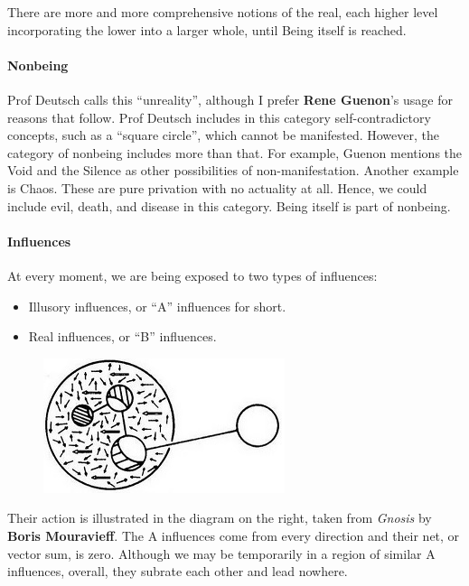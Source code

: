 There are more and more comprehensive notions of the real, each higher level incorporating the lower into a larger whole, until Being itself is reached.

\paragraph{Nonbeing}
Prof Deutsch calls this “unreality”, although I prefer \textbf{Rene Guenon}'s usage for reasons that follow. Prof Deutsch includes in this category self-contradictory concepts, such as a “square circle”, which cannot be manifested. However, the category of nonbeing includes more than that. For example, Guenon mentions the Void and the Silence as other possibilities of non-manifestation. Another example is Chaos. These are pure privation with no actuality at all. Hence, we could include evil, death, and disease in this category. Being itself is part of nonbeing.

\paragraph{Influences}
At every moment, we are being exposed to two types of influences:

\begin{itemize}
\item Illusory influences, or “A” influences for short. 
\item Real influences, or “B” influences. 
\end{itemize}

\begin{figure}
 \includegraphics[scale=.6]{a20141010Subration-img001.jpg}
\end{figure} 

Their action is illustrated in the diagram on the right, taken from \emph{Gnosis} by \textbf{Boris Mouravieff}. The A influences come from every direction and their net, or vector sum, is zero. Although we may be temporarily in a region of similar A influences, overall, they subrate each other and lead nowhere.

